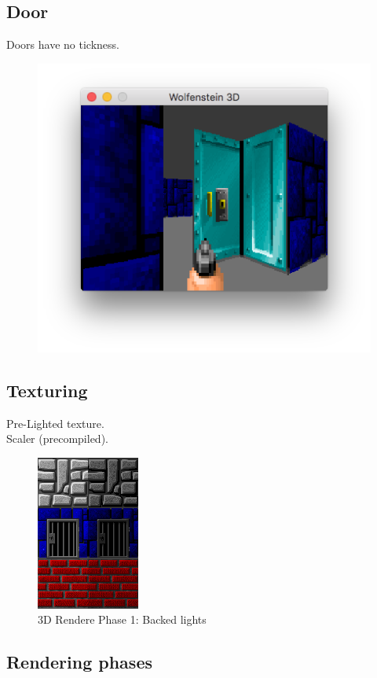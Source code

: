 \subsection{Door}
Doors have no tickness.\\
\begin{figure}[H]
 \centering
 \includegraphics[scale=1.3]{imgs/door_flat.png}
\end{figure}
\subsection{Texturing}


Pre-Lighted texture.\\
Scaler (precompiled).\\
  \begin{figure}[H]
\centering
 \includegraphics[scale=3.3]{imgs/baked_lights.png}
 \caption{3D Rendere Phase 1: Backed lights} \label{fig:backee_lights}
 \end{figure}

\subsection{Rendering phases}

